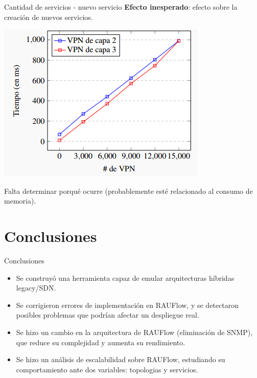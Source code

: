 \documentclass[xcolor=svgnames]{beamer}
\begin{document}
\begin{frame}{Cantidad de servicios - nuevo servicio}
	\textbf{Efecto inesperado}: efecto sobre la creación de nuevos servicios.
	\pause
	\begin{center}
		\includegraphics[scale=0.7]{cummulative_vpn}
	\end{center}
	\pause
	Falta determinar porqué ocurre (probablemente esté relacionado al consumo de memoria).
\end{frame}


\section{Conclusiones}

\begin{frame}{}
	\tableofcontents[currentsection]
\end{frame}

\begin{frame}{Conclusiones}
	\begin{itemize}
		\item Se construyó una herramienta capaz de emular arquitecturas híbridas legacy/SDN.
		\pause
		\item Se corrigieron errores de implementación en RAUFlow, y se detectaron posibles problemas que podrían afectar un despliegue real.
		\pause
		\item Se hizo un cambio en la arquitectura de RAUFlow (eliminación de SNMP), que reduce su complejidad y aumenta su rendimiento.
		\pause
		\item Se hizo un análisis de escalabilidad sobre RAUFlow, estudiando su comportamiento ante dos variables: topologias y servicios.
	\end{itemize}
\end{frame}
\end{document}
